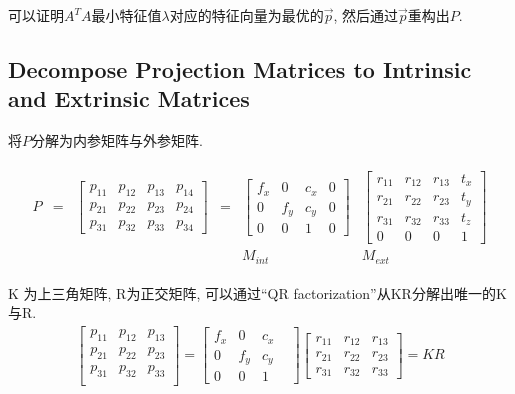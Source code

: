 可以证明$A^T A$最小特征值$\lambda$对应的特征向量为最优的$\vec{p}$, 然后通过$\vec{p}$重构出$P$. 

\subsection{Decompose Projection Matrices to Intrinsic and Extrinsic Matrices}
将$P$分解为内参矩阵与外参矩阵. 

\begin{align*}
    \begin{array}{cccccc}
        P&=&\begin{bmatrix}
            p_{11} & p_{12} & p_{13} & p_{14} \\
            p_{21} & p_{22} & p_{23} & p_{24} \\
            p_{31} & p_{32} & p_{33} & p_{34}
        \end{bmatrix}&=&\begin{bmatrix}
            f_x & 0 & c_x & 0\\
            0&f_y&c_y&0\\
            0&0&1&0
        \end{bmatrix}&\begin{bmatrix}
            r_{11} & r_{12} & r_{13} & t_x\\
            r_{21} & r_{22} & r_{23} & t_y\\
            r_{31} & r_{32} & r_{33} & t_z\\
            0&0&0&1
        \end{bmatrix}\\
         & & & &M_{int}&M_{ext} 
    \end{array}
\end{align*}

K 为上三角矩阵, R为正交矩阵, 可以通过``QR factorization''从KR分解出唯一的K与R. 
\begin{align*}
    \begin{bmatrix}
        p_{11} & p_{12} & p_{13}\\
        p_{21} & p_{22} & p_{23}\\
        p_{31} & p_{32} & p_{33}\\
    \end{bmatrix}=\begin{bmatrix}
        f_x &0&c_x\\
        0&f_y&c_y\\
        0&0&1&
    \end{bmatrix}\begin{bmatrix}
        r_{11} & r_{12} & r_{13}\\
        r_{21} & r_{22} & r_{23}\\
        r_{31} & r_{32} & r_{33}
    \end{bmatrix}=KR
\end{align*}

